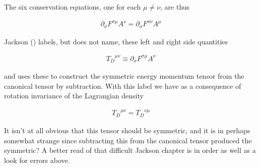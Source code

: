 The six conservation equations, one for each $\mu \ne \nu$, are thus

\begin{align}\label{eqn:maxwellLagRot:goo12}
\partial_\sigma F^{\sigma\mu} A^\nu = \partial_\sigma F^{\sigma\nu} A^\mu
\end{align}

Jackson (\citep{jackson1975cew}) labels, but does not name, these left and right side quantities

\begin{align}\label{eqn:maxwellLagRot:goo13}
{T_D}^{\mu\nu} \equiv \partial_\sigma F^{\sigma\mu} A^\nu
\end{align}

and uses these to construct the symmetric energy momentum tensor from the canonical tensor by subtraction.  With this label we have as a consequence of rotation invariance of the Lagrangian density

\begin{align}\label{eqn:maxwellLagRot:goo14}
{T_D}^{\mu\nu} = {T_D}^{\nu\mu}
\end{align}

It isn't at all obvious that this tensor should be symmetric, and it is in perhaps somewhat strange since subtracting this from the canonical tensor produced the symmetric?  A better read of that difficult Jackson chapter is in order as well as a look for errors above.

\EndArticle
